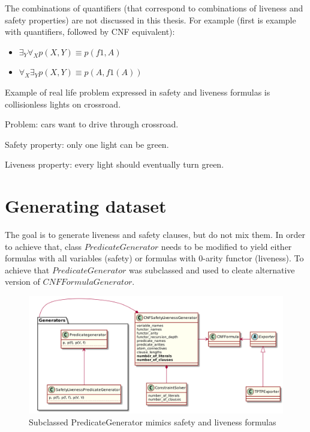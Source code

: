 The combinations of quantifiers (that correspond to combinations of liveness and safety properties) are not discussed in this thesis. For example (first is example with quantifiers, followed by CNF equivalent):
\begin{itemize}
\item $\exists_Y \forall_X p(X, Y) \equiv p(f1, A)$
\item $\forall_X \exists_Y p(X, Y) \equiv p(A,f1(A)) $
\end{itemize}

Example of real life problem expressed in safety and liveness formulas is collisionless lights on crossroad.

\noindent
Problem: cars want to drive through crossroad.

\noindent
Safety property: only one light can be green.

\noindent
Liveness property: every light should eventually turn green.

\section{Generating dataset}

The goal is to generate liveness and safety clauses, but do not mix them. In order to achieve that, class $PredicateGenerator$ needs to be modified to yield either formulas with all variables (safety) or formulas with 0-arity functor (liveness). To achieve that $PredicateGenerator$ was subclassed and used to cleate alternative version of $CNFFormulaGenerator$.

\begin{figure}[H]
\begin{centering}
  \includegraphics[width=\textwidth]{logic-formula-generator/fol/safety_liveness_predicate_generator.png}
  \caption{Subclassed PredicateGenerator mimics safety and liveness formulas}
\end{centering}
\end{figure}

